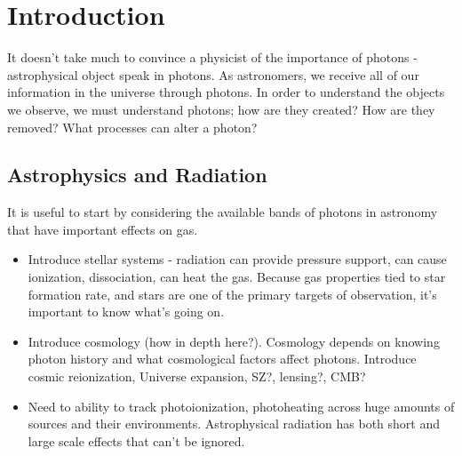 \pagestyle{fancy}
\headheight 20pt
\chead{}
\lfoot{}
\cfoot{\thepage}
\rfoot{}
\renewcommand{\headrulewidth}{0.1pt}
\renewcommand{\footrulewidth}{0.1pt}

\chapter{Introduction}
\label{chap:intro} 
\thispagestyle{fancy} 

It doesn't take much to convince a physicist of the importance of photons - astrophysical object speak in photons. As astronomers, we receive all of our information in the universe through photons. In order to understand the objects we observe, we must understand photons; how are they created? How are they removed? What processes can alter a photon?

\section{Astrophysics and Radiation}
\label{sec:astroandrad}

It is useful to start by considering the available bands of photons in astronomy that have important effects on gas.

\begin{itemize}
\item Introduce stellar systems -  radiation can provide pressure support, can cause ionization, dissociation, can heat the gas. Because gas properties tied to star formation rate, and stars are one of the primary targets of observation, it's important to know what's going on.
\item Introduce cosmology (how in depth here?). Cosmology depends on knowing photon history and what cosmological factors affect photons. Introduce cosmic reionization, Universe expansion, SZ?, lensing?, CMB?
\item Need to ability to track photoionization, photoheating across huge amounts of sources and their environments. Astrophysical radiation has both short and large scale effects that can't be ignored.
\end{itemize}



%
%
%
%
% 
%
%
% 
%


